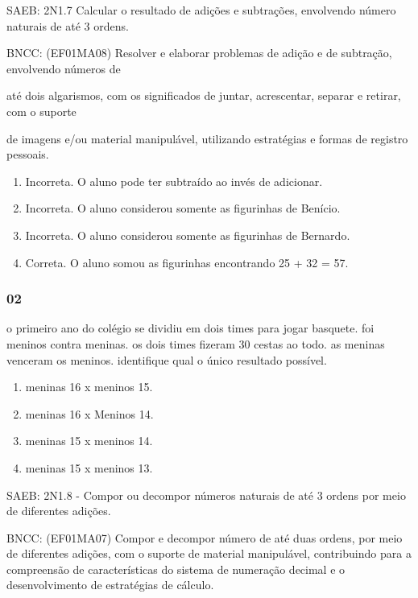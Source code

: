 SAEB: 2N1.7 Calcular o resultado de adições e subtrações, envolvendo
número naturais de até 3 ordens.

BNCC: (EF01MA08) Resolver e elaborar problemas de adição e de subtração,
envolvendo números de

até dois algarismos, com os significados de juntar, acrescentar, separar
e retirar, com o suporte

de imagens e/ou material manipulável, utilizando estratégias e formas de
registro pessoais.

\begin{enumerate}
\def\labelenumi{\alph{enumi})}
\item
  Incorreta. O aluno pode ter subtraído ao invés de adicionar.
\item
  Incorreta. O aluno considerou somente as figurinhas de Benício.
\item
  Incorreta. O aluno considerou somente as figurinhas de Bernardo.
\item
  Correta. O aluno somou as figurinhas encontrando 25 + 32 = 57.
\end{enumerate}

\subsubsection{02}\label{section-24}

o primeiro ano do colégio se dividiu em dois times para jogar basquete.
foi meninos contra meninas. os dois times fizeram 30 cestas ao todo. as
meninas venceram os meninos. identifique qual o único resultado
possível.

\begin{enumerate}
\def\labelenumi{\Alph{enumi})}
\item
  meninas 16 x meninos 15.
\item
  meninas 16 x Meninos 14.
\item
  meninas 15 x meninos 14.
\item
  meninas 15 x meninos 13.
\end{enumerate}

SAEB: 2N1.8 - Compor ou decompor números naturais de até 3 ordens por
meio de diferentes adições.

BNCC: (EF01MA07) Compor e decompor número de até duas ordens, por meio
de diferentes adições, com o suporte de material manipulável,
contribuindo para a compreensão de características do sistema de
numeração decimal e o desenvolvimento de estratégias de cálculo.

